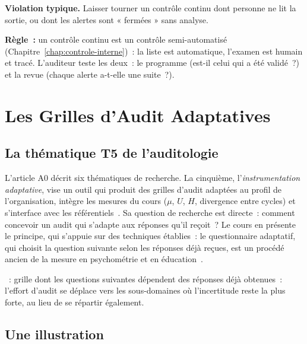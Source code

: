 \begin{boxalert}
\textbf{Violation typique.} Laisser tourner un contrôle continu dont
personne ne lit la sortie, ou dont les alertes sont « fermées » sans
analyse.

\smallskip
\textbf{Règle~:} un contrôle continu est un contrôle semi-automatisé
(Chapitre~\ref{chap:controle-interne})~: la liste est automatique, l'examen
est humain et tracé. L'auditeur teste les deux~: le programme (est-il
celui qui a été validé~?) et la revue (chaque alerte a-t-elle une suite~?).
\end{boxalert}

\section{Les Grilles d'Audit Adaptatives}
\label{sec:c27-adaptatif}

\subsection{La thématique T5 de l'auditologie}

L'article A0 décrit six thématiques de recherche. La cinquième,
l'\emph{instrumentation adaptative}, vise un outil qui produit des grilles
d'audit adaptées au profil de l'organisation, intègre les mesures du
cours ($\mu$, $U$, $H$, divergence entre cycles) et s'interface avec les
référentiels~\cite{minka2026auditologie}. Sa question de recherche est
directe~: comment concevoir un audit qui s'adapte aux réponses qu'il
reçoit~? Le cours en présente le principe, qui s'appuie sur des techniques
établies~: le questionnaire adaptatif, qui choisit la question suivante
selon les réponses déjà reçues, est un procédé ancien de la mesure en
psychométrie et en éducation~\cite{wainer2000cat}.

\begin{boxdef}
~: grille dont les
questions suivantes dépendent des réponses déjà obtenues~: l'effort
d'audit se déplace vers les sous-domaines où l'incertitude reste la plus
forte, au lieu de se répartir également.
\end{boxdef}

\subsection{Une illustration}

